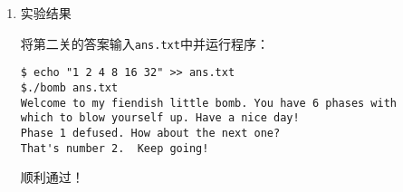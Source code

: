 \documentclass{paper}
\begin{document}
\begin{enumerate}
\begin{enumerate}
\begin{lstlisting}[language=C]
Breakpoint 1, 0x08048b76 in phase_2 ()
(gdb) x /6uw 0x4+$esp // 通过观察0x4+$esp中的内容
0xffffc954:     1       1       4       5
0xffffc964:     1       4
\end{lstlisting}

通过观察\verb|0x4+$esp|中的内容可以发现，我们输入的数字存放在以\verb|0x4+$esp|为首地址的连续内存中。

\item 找出所需要输入的数字具体的值 

接着分析代码段，找出第一个数字的值：

\begin{lstlisting}
8048b76:	83 7c 24 04 01       	cmpl   $0x1,0x4(%esp) // 第一个数字
8048b7b:	74 05                	je     8048b82 <phase_2+0x2e>
8048b7d:	e8 9f 05 00 00       	call   8049121 <explode_bomb>
8048b82:	8d 5c 24 04          	lea    0x4(%esp),%ebx
\end{lstlisting}

上述代码段的逻辑十分简单，即：若第一个数字等于\verb|0x1|则跳过\verb|explode_bomb|函数。因此，我们需要输入的第一个数字是\verb|1|。

分析接下来的循环结构代码，得出剩下数字的值：

\begin{lstlisting}
8048b82:	8d 5c 24 04        lea    0x4(%esp),%ebx // 首地址
8048b86:	8d 74 24 18        lea    0x18(%esp),%esi // 尾地址
8048b8a:	8b 03              mov    (%ebx),%eax // loop start
8048b8c:	01 c0              add    %eax,%eax
8048b8e:	39 43 04           cmp    %eax,0x4(%ebx)
8048b91:	74 05              je     8048b98 <phase_2+0x44>
8048b93:	e8 89 05 00 00     call   8049121 <explode_bomb>
8048b98:	83 c3 04           add    $0x4,%ebx
8048b9b:	39 f3              cmp    %esi,%ebx
8048b9d:	75 eb              jne    8048b8a <phase_2+0x36> // loop end
\end{lstlisting}

由\verb|0x18 = 24 = 6*sizeof(int)|可知，\verb|0x18+%esp|是第六个数字的地址。分析上述代码：进入循环前程序先将数组的首地址存放在\verb|%ebx|中，将数组的尾地址存放在\verb|%esi|中。进入循环后，程序将当前数字存放在\verb|%eax|中，并将\verb|2*%eax|与下一个数字（\verb|0x4(%ebx)|）进行比较，若两者相等，则跳过\verb|explode_bomb|。因此剩下的数字的值分别是前一个数字的两倍。

综合上述分析可知，由于第一个数字是\verb|1|，因此接下来的每一个数字分别是\verb|2、4、8、16、32|。

\end{enumerate}

\item 实验结果

将第二关的答案输入\verb|ans.txt|中并运行程序：

\begin{lstlisting}
$ echo "1 2 4 8 16 32" >> ans.txt
$./bomb ans.txt
Welcome to my fiendish little bomb. You have 6 phases with
which to blow yourself up. Have a nice day!
Phase 1 defused. How about the next one?
That's number 2.  Keep going!
\end{lstlisting}

顺利通过！

\end{enumerate}
\end{document}
